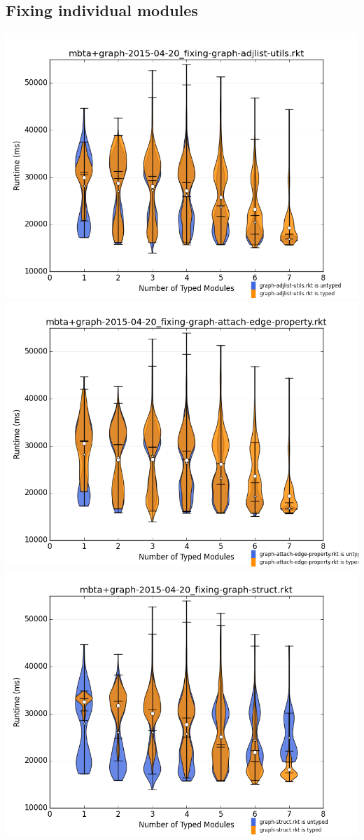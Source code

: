 \documentclass{article}
\begin{document}
\subsection{Fixing individual modules}
\includegraphics[width=\textwidth]{mbta+graph-2015-04-20_fixing-graph-adjlist-utils.rkt-dv.png}
\includegraphics[width=\textwidth]{mbta+graph-2015-04-20_fixing-graph-attach-edge-property.rkt-dv.png}
\includegraphics[width=\textwidth]{mbta+graph-2015-04-20_fixing-graph-struct.rkt-dv.png}
\end{document}

